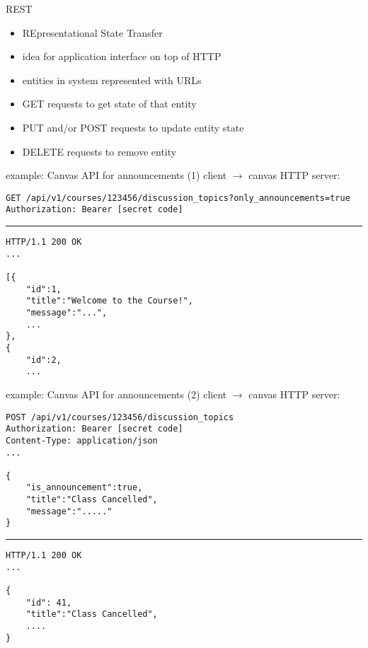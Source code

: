 \begin{frame}{REST}
    \begin{itemize}
    \item REpresentational State Transfer
    \item idea for application interface on top of HTTP
    \vspace{.5cm}
    \item entities in system represented with URLs
    \item GET requests to get state of that entity
    \item PUT and/or POST requests to update entity state
    \item DELETE requests to remove entity
    \end{itemize}
\end{frame}

\begin{frame}[fragile]{example: Canvas API for announcements (1)}
client $\rightarrow$ canvas HTTP server:
\begin{Verbatim}[fontsize=\fontsize{9}{10}\selectfont]
GET /api/v1/courses/123456/discussion_topics?only_announcements=true
Authorization: Bearer [secret code]
\end{Verbatim}
\rule{0.9\textwidth}{1mm}
\begin{Verbatim}[fontsize=\fontsize{9}{10}\selectfont]
HTTP/1.1 200 OK
...

[{
    "id":1,
    "title":"Welcome to the Course!",
    "message":"...",
    ...
},
{
    "id":2,
    ...
\end{Verbatim}
\end{frame}

\begin{frame}[fragile]{example: Canvas API for announcements (2)}
client $\rightarrow$ canvas HTTP server:
\begin{Verbatim}[fontsize=\fontsize{9}{10}\selectfont]
POST /api/v1/courses/123456/discussion_topics
Authorization: Bearer [secret code]
Content-Type: application/json
...

{
    "is_announcement":true,
    "title":"Class Cancelled",
    "message":"....."
}
\end{Verbatim}
\rule{0.9\textwidth}{1mm}
\begin{Verbatim}[fontsize=\fontsize{9}{10}\selectfont]
HTTP/1.1 200 OK
...

{
    "id": 41,
    "title":"Class Cancelled",
    ....
}
\end{Verbatim}
\end{frame}

